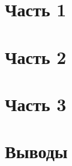 \documentclass[a4paper,10pt,russian]{article}
\begin{document}

\setcounter{page}{2}

\section{Часть 1}


\section{Часть 2}


\section{Часть 3}


\section{Выводы}

\end{document}
